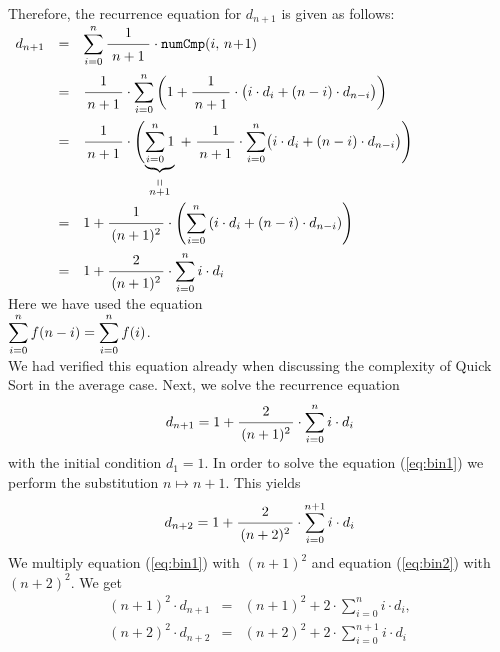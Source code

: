 Therefore, the recurrence equation for $d_{n+1}$ is given as follows: 
\\[0.2cm]
\hspace*{1.3cm}
$
\begin{array}{lcl}
d_{n+1} 
& = &  
\ds\sum\limits_{i=0}^n \bruch{1}{\,n+1\,} \cdot \texttt{numCmp}(i,\,n\!+\!1)  \\[0.5cm]
& = &  
\ds\bruch{1}{n+1} \cdot \sum\limits_{i=0}^n  
           \left(1 + \bruch{1}{n+1} \cdot \bigl(i \cdot d_i + (n-i) \cdot d_{n-i} \bigr) \right)
\\[0.5cm]
& = &  
\bruch{1}{n+1} \cdot \Biggl(\underbrace{\sum\limits_{i=0}^n 1}_{\stackrel{\displaystyle \shortparallel}{n+1}} \;+\;
           \bruch{1}{n+1} \cdot \ds\sum\limits_{i=0}^n \bigl(i \cdot d_i + (n-i) \cdot d_{n-i} \bigr) \Biggr)
\\[1.3cm]
& = &  
1 + \bruch{1}{(n+1)^2} \cdot \left(\ds\sum\limits_{i=0}^n \left(i\cdot d_i + (n-i)\cdot d_{n-i}\right) \right) 
\\[0.5cm]
& = &  
1 + \bruch{2}{(n+1)^2} \cdot \ds\sum\limits_{i=0}^n i\cdot d_i 
\end{array}
$
\\[0.2cm]
Here we have used the equation  \\[0.2cm]
\hspace*{1.3cm}
$\displaystyle\sum\limits_{i=0}^n f(n-i) = \sum\limits_{i=0}^n f(i)$. \\[0.2cm]
We had verified this equation already when discussing the complexity of Quick Sort in the average
case.  Next, we solve the recurrence equation 
\begin{equation}
  \label{eq:bin1}
d_{n+1} = \displaystyle 1 + \bruch{2}{(n+1)^2} \cdot \sum\limits_{i=0}^n i\cdot d_i  
\end{equation}
with the initial condition $d_1 = 1$.  
In order to solve the equation (\ref{eq:bin1}) we perform the substitution $n \mapsto n+1$.  This yields
\begin{equation}
  \label{eq:bin2}
d_{n+2} = \displaystyle 1 + \bruch{2}{(n+2)^2} \cdot \sum\limits_{i=0}^{n+1} i\cdot d_i  
\end{equation}
We multiply equation (\ref{eq:bin1}) with $(n+1)^2$ and equation (\ref{eq:bin2}) 
with $(n+2)^2$.  We get
\begin{eqnarray}
  \label{eq:bin3}
(n+1)^2 \cdot d_{n+1} & = & (n+1)^2 + 2 \cdot \sum\limits_{i=0}^n i\cdot d_i, \\
  \label{eq:bin4}
(n+2)^2 \cdot d_{n+2} & = & (n+2)^2 + 2 \cdot \sum\limits_{i=0}^{n+1} i\cdot d_i
\end{eqnarray}
